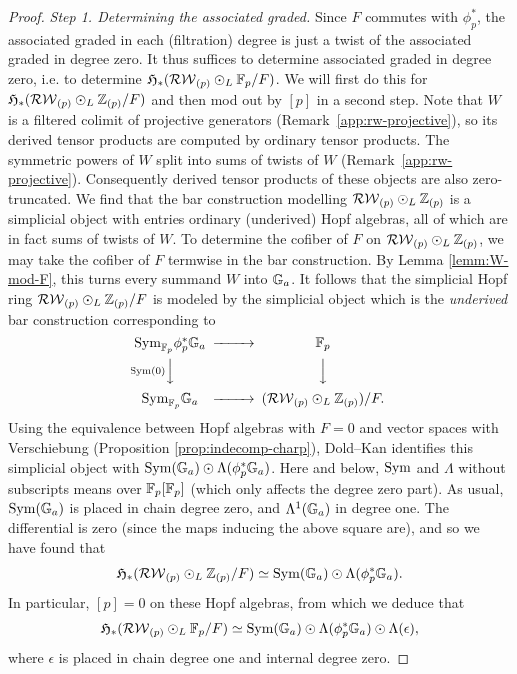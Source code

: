 \begin{proof}
\emph{Step 1. Determining the associated graded.}
Since $F$ commutes with $\phi_p^*$, the associated graded in each (filtration) degree is just a twist of the associated graded in degree zero.
It thus suffices to determine associated graded in degree zero, i.e. to determine $\mathfrak H_*(\mathcal{RW}_{(p)} \odot_L \mathbb{F}_p/F)$.
We will first do this for $\mathfrak H_*(\mathcal{RW}_{(p)} \odot_L \mathbb{Z}_{(p)}/F)$ and then mod out by $[p]$ in a second step.
Note that $W$ is a filtered colimit of projective generators (Remark~\ref{app:rw-projective}), so its derived tensor products are computed by ordinary tensor products.
The symmetric powers of $W$ split into sums of twists of $W$ (Remark~\ref{app:rw-projective}).
Consequently derived tensor products of these objects are also zero-truncated.
We find that the bar construction modelling $\mathcal{RW}_{(p)} \odot_L \mathbb{Z}_{(p)}$ is a simplicial object with entries ordinary (underived) Hopf algebras, all of which are in fact sums of twists of $W$.
To determine the cofiber of $F$ on $\mathcal{RW}_{(p)} \odot_L \mathbb{Z}_{(p)}$, we may take the cofiber of $F$ termwise in the bar construction.
By Lemma \ref{lemm:W-mod-F}, this turns every summand $W$ into ${\mathbb G}_a$.
It follows that the simplicial Hopf ring $\mathcal{RW}_{(p)} \odot_L \mathbb{Z}_{(p)}/F$ is modeled by the simplicial object which is the \emph{underived} bar construction corresponding to 
\begin{equation*}
\begin{CD}
\Sym_{\F_p} \phi_p^* \Ga @>>> \F_p \\
  @V\Sym(0)VV        @VVV \\
\Sym_{\F_p} \Ga @>>> (\dRW_{(p)} \hotimes_L \Z_{(p)})/F.
\end{CD}
\end{equation*}
Using the equivalence between Hopf algebras with $F=0$ and vector spaces with Verschiebung (Proposition \ref{prop:indecomp-charp}), Dold--Kan identifies this simplicial object with $\mathrm{Sym}({\mathbb G}_a) \odot \Lambda(\phi_p^* {\mathbb G}_a)$.
Here and below, $\mathrm{Sym}$ and $\Lambda$ without subscripts means over $\mathbb{F}_p[\mathbb{F}_p]$ (which only affects the degree zero part).
As usual, $\mathrm{Sym}({\mathbb G}_a)$ is placed in chain degree zero, and $\Lambda^1({\mathbb G}_a)$ in degree one.
The differential is zero (since the maps inducing the above square are), and so we have found that \[ \mathfrak H_*(\mathcal{RW}_{(p)} \odot_L \mathbb{Z}_{(p)}/F) \simeq \mathrm{Sym}({\mathbb G}_a) \odot \Lambda(\phi_p^* {\mathbb G}_a). \]
In particular, $[p]=0$ on these Hopf algebras, from which we deduce that \[ \mathfrak H_*(\mathcal{RW}_{(p)} \odot_L \mathbb{F}_p/F) \simeq \mathrm{Sym}({\mathbb G}_a) \odot \Lambda(\phi_p^* {\mathbb G}_a) \odot \Lambda(\epsilon), \] where $\epsilon$ is placed in chain degree one and internal degree zero.


\end{proof}
